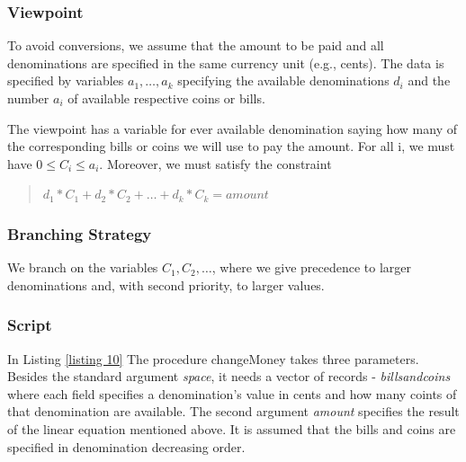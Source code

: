 \documentclass[a4paper,halfparskip]{scrartcl}
\begin{document}
\subsubsection{Viewpoint}
To avoid conversions, we assume that the amount to be paid and all 
denominations are specified in the same currency unit (e.g., cents). 
The data is specified by variables $ a_1, \ldots, a_k $ specifying 
the available denominations $ d_i $ and the number $ a_i $ of available 
respective coins or bills.

The viewpoint has a variable for ever available denomination saying how many 
of the corresponding bills or coins we will use to pay the amount. For all i, 
we must have $ 0 \leq C_i \leq a_i $. Moreover, we must satisfy the constraint 
\begin{quote}
$ d_1 * C_1 + d_2 * C_2 + \ldots + d_k * C_k = amount $
\end{quote}

\subsubsection{Branching Strategy}
We branch on the variables $ C_1, C_2, \ldots $, where we give precedence 
to larger denominations
and, with second priority, to larger values. 

\subsubsection{Script}
In Listing \ref{listing 10} 
The procedure changeMoney takes three parameters. Besides the standard
argument \emph{space}, it needs a vector of records - \emph{billsandcoins}
where each field specifies a denomination's value in cents and how many 
coints of that denomination are available. The second argument 
\emph{amount} specifies the result of the linear equation mentioned above.
 It is assumed that the 
bills and coins are specified in denomination decreasing order.
\end{document}
